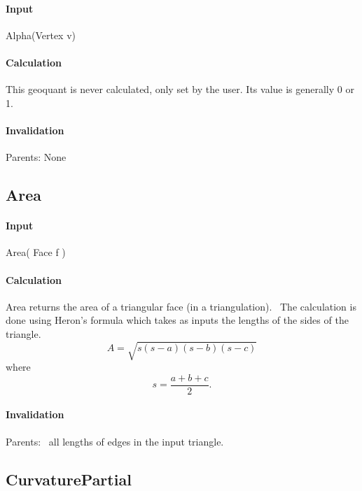 \paragraph{Input}

Alpha(Vertex v)

\paragraph{Calculation}

This geoquant is never calculated, only set by the user. Its value is
generally 0 or 1.

\paragraph{Invalidation}

Parents: None

\subsection{Area}

\paragraph{Input}

Area( Face f )

\paragraph{Calculation}

Area returns the area of a triangular face (in a triangulation). \ The
calculation is done using Heron's formula which takes as inputs the lengths
of the sides of the triangle.%
\begin{equation*}
A=\sqrt{s\left( s-a\right) \left( s-b\right) \left( s-c\right) }
\end{equation*}%
where%
\begin{equation*}
s=\frac{a+b+c}{2}.
\end{equation*}

\paragraph{Invalidation}

Parents: \ all lengths of edges in the input triangle.

\subsection{CurvaturePartial}

